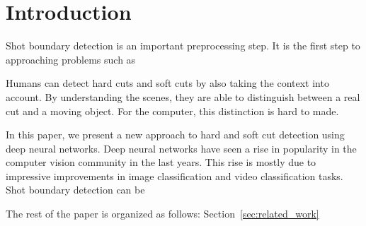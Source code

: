 \section{Introduction}
\label{sec:introduction}

Shot boundary detection is an important preprocessing step.
It is the first step to approaching problems such as 


Humans can detect hard cuts and soft cuts by also taking the context into account.
By understanding the scenes, they are able to distinguish between a real cut and a moving object.
For the computer, this distinction is hard to made.

In this paper, we present a new approach to hard and soft cut detection using deep neural networks.
Deep neural networks have seen a rise in popularity in the computer vision community in the last years.
This rise is mostly due to impressive improvements in image classification and video classification tasks.
Shot boundary detection can be 

The rest of the paper is organized as follows:
Section~\ref{sec:related_work}
